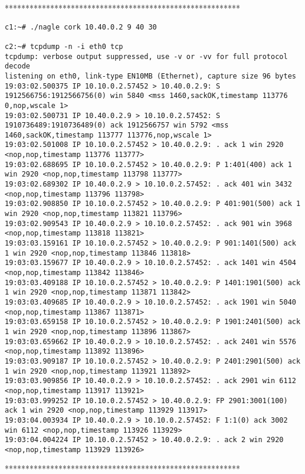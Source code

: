 \documentclass[a4paper,12pt]{article}
\begin{document}
*********************************************************

\begin{lstlisting}
c1:~# ./nagle cork 10.40.0.2 9 40 30

c2:~# tcpdump -n -i eth0 tcp
tcpdump: verbose output suppressed, use -v or -vv for full protocol decode
listening on eth0, link-type EN10MB (Ethernet), capture size 96 bytes
19:03:02.500375 IP 10.10.0.2.57452 > 10.40.0.2.9: S 1912566756:1912566756(0) win 5840 <mss 1460,sackOK,timestamp 113776 0,nop,wscale 1>
19:03:02.500731 IP 10.40.0.2.9 > 10.10.0.2.57452: S 1910736489:1910736489(0) ack 1912566757 win 5792 <mss 1460,sackOK,timestamp 113777 113776,nop,wscale 1>
19:03:02.501008 IP 10.10.0.2.57452 > 10.40.0.2.9: . ack 1 win 2920 <nop,nop,timestamp 113776 113777>
19:03:02.688695 IP 10.10.0.2.57452 > 10.40.0.2.9: P 1:401(400) ack 1 win 2920 <nop,nop,timestamp 113798 113777>
19:03:02.689302 IP 10.40.0.2.9 > 10.10.0.2.57452: . ack 401 win 3432 <nop,nop,timestamp 113796 113798>
19:03:02.908850 IP 10.10.0.2.57452 > 10.40.0.2.9: P 401:901(500) ack 1 win 2920 <nop,nop,timestamp 113821 113796>
19:03:02.909543 IP 10.40.0.2.9 > 10.10.0.2.57452: . ack 901 win 3968 <nop,nop,timestamp 113818 113821>
19:03:03.159161 IP 10.10.0.2.57452 > 10.40.0.2.9: P 901:1401(500) ack 1 win 2920 <nop,nop,timestamp 113846 113818>
19:03:03.159677 IP 10.40.0.2.9 > 10.10.0.2.57452: . ack 1401 win 4504 <nop,nop,timestamp 113842 113846>
19:03:03.409188 IP 10.10.0.2.57452 > 10.40.0.2.9: P 1401:1901(500) ack 1 win 2920 <nop,nop,timestamp 113871 113842>
19:03:03.409685 IP 10.40.0.2.9 > 10.10.0.2.57452: . ack 1901 win 5040 <nop,nop,timestamp 113867 113871>
19:03:03.659158 IP 10.10.0.2.57452 > 10.40.0.2.9: P 1901:2401(500) ack 1 win 2920 <nop,nop,timestamp 113896 113867>
19:03:03.659662 IP 10.40.0.2.9 > 10.10.0.2.57452: . ack 2401 win 5576 <nop,nop,timestamp 113892 113896>
19:03:03.909187 IP 10.10.0.2.57452 > 10.40.0.2.9: P 2401:2901(500) ack 1 win 2920 <nop,nop,timestamp 113921 113892>
19:03:03.909856 IP 10.40.0.2.9 > 10.10.0.2.57452: . ack 2901 win 6112 <nop,nop,timestamp 113917 113921>
19:03:03.999252 IP 10.10.0.2.57452 > 10.40.0.2.9: FP 2901:3001(100) ack 1 win 2920 <nop,nop,timestamp 113929 113917>
19:03:04.003934 IP 10.40.0.2.9 > 10.10.0.2.57452: F 1:1(0) ack 3002 win 6112 <nop,nop,timestamp 113926 113929>
19:03:04.004224 IP 10.10.0.2.57452 > 10.40.0.2.9: . ack 2 win 2920 <nop,nop,timestamp 113929 113926>
\end{lstlisting}

*********************************************************
\end{document}
